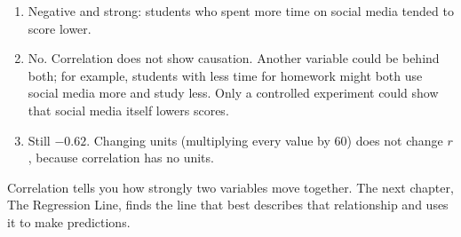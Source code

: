 \begin{Answer}[ref={ex:workedex}]
\begin{enumerate}
\item Negative and strong: students who spent more time on social media
      tended to score lower.
\item No. Correlation does not show causation. Another variable could be
      behind both; for example, students with less time for homework might
      both use social media more and study less. Only a controlled
      experiment could show that social media itself lowers scores.
\item Still $-0.62$. Changing units (multiplying every value by 60) does
      not change $r$, because correlation has no units.
\end{enumerate}
\end{Answer}

Correlation tells you how strongly two variables move together. The next chapter, The Regression Line,
finds the line that best describes that relationship and uses it to make predictions.

